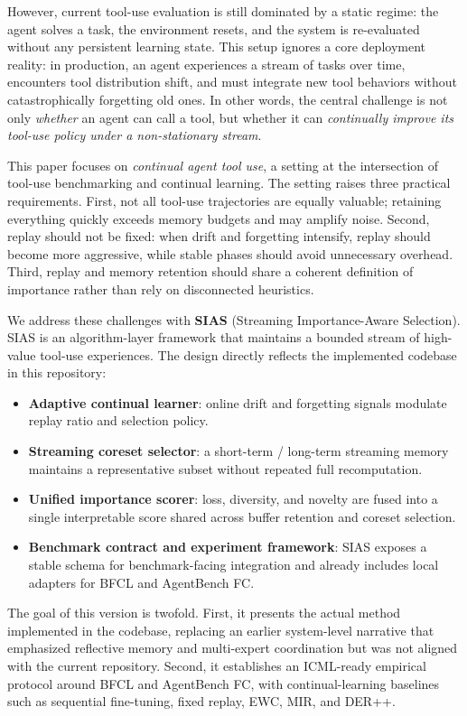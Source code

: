\documentclass{article}
\begin{document}
However, current tool-use evaluation is still dominated by a static regime: the agent solves a task, the environment resets, and the system is re-evaluated without any persistent learning state. This setup ignores a core deployment reality: in production, an agent experiences a stream of tasks over time, encounters tool distribution shift, and must integrate new tool behaviors without catastrophically forgetting old ones. In other words, the central challenge is not only \emph{whether} an agent can call a tool, but whether it can \emph{continually improve its tool-use policy under a non-stationary stream}.

This paper focuses on \emph{continual agent tool use}, a setting at the intersection of tool-use benchmarking and continual learning. The setting raises three practical requirements. First, not all tool-use trajectories are equally valuable; retaining everything quickly exceeds memory budgets and may amplify noise. Second, replay should not be fixed: when drift and forgetting intensify, replay should become more aggressive, while stable phases should avoid unnecessary overhead. Third, replay and memory retention should share a coherent definition of importance rather than rely on disconnected heuristics.

We address these challenges with \textbf{SIAS} (Streaming Importance-Aware Selection). SIAS is an algorithm-layer framework that maintains a bounded stream of high-value tool-use experiences. The design directly reflects the implemented codebase in this repository:
\begin{itemize}[leftmargin=12pt]
    \item \textbf{Adaptive continual learner}: online drift and forgetting signals modulate replay ratio and selection policy.
    \item \textbf{Streaming coreset selector}: a short-term / long-term streaming memory maintains a representative subset without repeated full recomputation.
    \item \textbf{Unified importance scorer}: loss, diversity, and novelty are fused into a single interpretable score shared across buffer retention and coreset selection.
    \item \textbf{Benchmark contract and experiment framework}: SIAS exposes a stable schema for benchmark-facing integration and already includes local adapters for BFCL and AgentBench FC.
\end{itemize}

The goal of this version is twofold. First, it presents the actual method implemented in the codebase, replacing an earlier system-level narrative that emphasized reflective memory and multi-expert coordination but was not aligned with the current repository. Second, it establishes an ICML-ready empirical protocol around BFCL and AgentBench FC, with continual-learning baselines such as sequential fine-tuning, fixed replay, EWC, MIR, and DER++.
\end{document}

